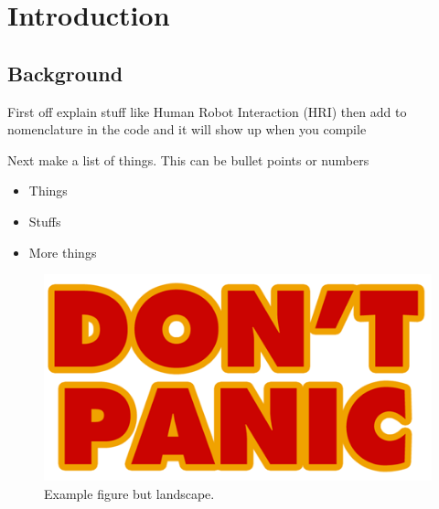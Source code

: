 
\chapter{Introduction}


\section{Background}\label{ref:background}


First off explain stuff like Human Robot Interaction (HRI) then add to nomenclature in the code and it will show up when you compile


Next make a list of things. This can be bullet points or numbers

\begin{itemize}
	\item[] Things
	\item[] Stuffs
	\item[] More things
\end{itemize}



\begin{landscape}
	\begin{figure} 
		\centering    
		\includegraphics[width=1.2\textwidth]{Chapter1/Figs/dont-panic.png}
		\caption[This bit of text goes at the list of figures so might be slightly different.]{Example figure but landscape.}
		\label{fig:exoflow}
	\end{figure}
\end{landscape}


